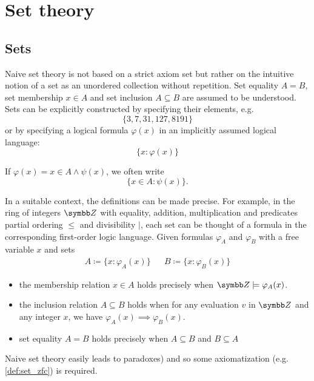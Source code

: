 \section{Set theory}\label{sec:set_theory}
\subsection{Sets}\label{subsec:sets}

\begin{definition}\label{def:set_naive}\cite[chapter 1]{Enderton1977}
  Naive set theory is not based on a strict axiom set but rather on the intuitive notion of a set as an unordered collection without repetition. Set equality \( A = B \), set membership \( x \in A \) and set inclusion \( A \subseteq B \) are assumed to be understood. Sets can be explicitly constructed by specifying their elements, e.g.
  \begin{equation*}
    \{ 3, 7, 31, 127, 8191 \}
  \end{equation*}
  or by specifying a logical formula \( \varphi(x) \) in an implicitly assumed logical language:
  \begin{equation*}
    \{ x \colon \varphi(x) \}
  \end{equation*}

  If \( \varphi(x) = x \in A \land \psi(x) \), we often write
  \begin{equation*}
    \{ x \in A \colon \psi(x) \}.
  \end{equation*}

  In a suitable context, the definitions can be made precise. For example, in the ring of integers \( \BZ \) with equality, addition, multiplication and predicates partial ordering \( \leq \) and divisibility \( \vert \), each set can be thought of a formula in the corresponding first-order logic language. Given formulas \( \varphi_A \) and \( \varphi_B \) with a free variable \( x \) and sets
  \begin{align*}
    A \coloneqq \{ x \colon \varphi_A(x) \} && B \coloneqq \{ x \colon \varphi_B(x) \}
  \end{align*}

  \begin{itemize}
    \item the membership relation \( x \in A \) holds precisely when \( \BZ \models \varphi_A(x) \).

    \item the inclusion relation \( A \subseteq B \) holds when for any evaluation \( v \) in \( \BZ \) and any integer \( x \), we have \( \varphi_A(x) \implies \varphi_B(x) \).

    \item set equality \( A = B \) holds precisely when \( A \subseteq B \) and \( B \subseteq A \)
  \end{itemize}

  Naive set theory easily leads to paradoxes) and so some axiomatization (e.g. \cref{def:set_zfc}) is required.
\end{definition}

